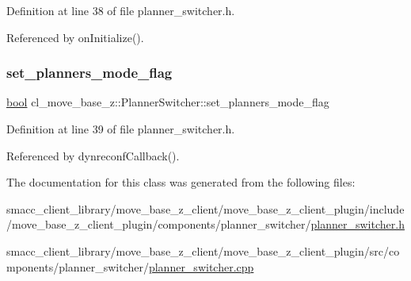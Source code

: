 Definition at line 38 of file planner\+\_\+switcher.\+h.



Referenced by on\+Initialize().

\mbox{\label{classcl__move__base__z_1_1PlannerSwitcher_a6c14fd001513787ed213704e2d3dc383}} 
\subsubsection{\texorpdfstring{set\+\_\+planners\+\_\+mode\+\_\+flag}{set\_planners\_mode\_flag}}
{\footnotesize\ttfamily \hyperlink{classbool}{bool} cl\+\_\+move\+\_\+base\+\_\+z\+::\+Planner\+Switcher\+::set\+\_\+planners\+\_\+mode\+\_\+flag\hspace{0.3cm}{\ttfamily [private]}}



Definition at line 39 of file planner\+\_\+switcher.\+h.



Referenced by dynreconf\+Callback().



The documentation for this class was generated from the following files\+:\begin{DoxyCompactItemize}
\item 
smacc\+\_\+client\+\_\+library/move\+\_\+base\+\_\+z\+\_\+client/move\+\_\+base\+\_\+z\+\_\+client\+\_\+plugin/include/move\+\_\+base\+\_\+z\+\_\+client\+\_\+plugin/components/planner\+\_\+switcher/\hyperlink{planner__switcher_8h}{planner\+\_\+switcher.\+h}\item 
smacc\+\_\+client\+\_\+library/move\+\_\+base\+\_\+z\+\_\+client/move\+\_\+base\+\_\+z\+\_\+client\+\_\+plugin/src/components/planner\+\_\+switcher/\hyperlink{planner__switcher_8cpp}{planner\+\_\+switcher.\+cpp}\end{DoxyCompactItemize}
